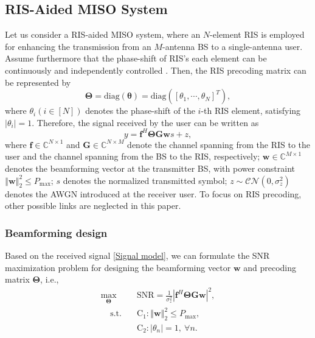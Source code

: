 \documentclass[12pt,draftclsnofoot,journal,onecolumn]{IEEEtran}
\theoremstyle{nonumberplain}
\def \diag {\text{diag}}
\begin{document}
    \subsection{RIS-Aided MISO System}  \label{MISO case}
        Let us consider a RIS-aided MISO system, where an $N$-element RIS is employed for enhancing the transmission from an $M$-antenna \ac{BS} to a single-antenna user. Assume furthermore that the phase-shift of RIS's each element can be continuously and independently controlled \cite{wu2019intelligent}. Then, the RIS precoding matrix can be represented by
        \begin{equation}
            \label{RIS}
            \bm \Theta = \diag \left(\bm \theta\right )=\diag \left(\left[\theta_{1},\cdots ,\theta_{N}\right]^{T}\right),
        \end{equation}
        where $\theta_i (i\in[N])$ denotes the phase-shift of the $i$-th RIS element, satisfying $\lvert \theta_i\rvert=1$. Therefore, the signal received by the user can be written as 
        \begin{equation}
            \label{Signal model}
            y=\bm f^{H} \bm\Theta \bm G \bm w s+z,
        \end{equation}
        where $\bm f\in \mathbb C ^{N\times 1}$ and $\bm G \in \mathbb C^{N\times M}$ denote the channel spanning from the RIS to the user and the channel spanning from the BS to the RIS, respectively; $\bm w\in \mathbb C^{M\times 1}$ denotes the beamforming vector at the transmitter BS, with power constraint $\left\Vert \bm w\right \Vert_{2}^{2}\leq P_{\text{max}}$; $s$ denotes the normalized transmitted symbol; $z\sim \mathcal{CN}\left(0,\sigma_{z}^{2}\right)$ denotes the \ac{AWGN} introduced at the receiver user. To focus on RIS precoding, other possible links are neglected in this paper.
        
        \subsubsection{Beamforming design}
        Based on the received signal \eqref{Signal model}, we can formulate the \ac{SNR} maximization problem for designing the beamforming vector $\bm w$ and precoding matrix $\bm \Theta$, i.e.,
        \begin{subequations}
\label{optimization}
\begin{align}
\label{objective}
\max_{\bm \Theta}~~&\text{SNR}=\frac{1}{\sigma_{z}^{2}}
\left\vert
\bm f^{H}\bm \Theta\bm G\bm w \right\vert^{2},\\
\label{constraint}
~~~~~\text{s.t.~~~}&\text{C}_{1}: \left\Vert \bm w\right \Vert_{2}^{2}\leq P_{\text{max}},\\
&\text{C}_{2}: \left\vert\theta_{n}\right\vert=1,~\forall n.
\end{align}
\end{subequations}
        
\end{document}
